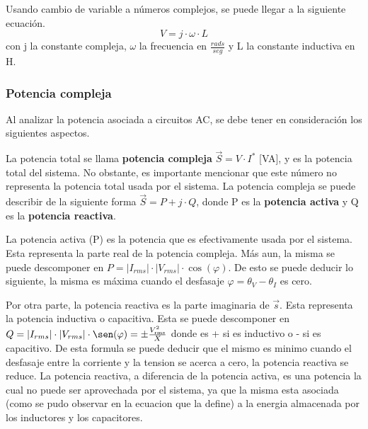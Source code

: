 \documentclass{article}
\begin{document}
        Usando cambio de variable a números complejos, se puede llegar a la siguiente ecuación.
        \begin{equation*}
            V=j\cdot \omega\cdot L
        \end{equation*}
        con j la constante compleja, $\omega$ la frecuencia en $\frac{rads}{seg}$ y L la constante inductiva en H.

        \subsubsection{Potencia compleja}

        Al analizar la potencia asociada a circuitos AC, se debe tener en consideración los siguientes aspectos.\par
        La potencia total se llama { \bfseries potencia compleja} $\vec{S}= V \cdot I^{*}$ [VA], y es la potencia total del sistema. No obstante, es importante mencionar que este número no representa la potencia total usada por el sistema.
        La potencia compleja se puede describir de la siguiente forma $\vec{S}=P + j \cdot Q$, donde P es la { \bfseries potencia activa} y Q es la {\bfseries potencia reactiva}. \par

        La potencia activa (P) es la potencia que es efectivamente usada por el sistema. Esta representa la parte real de la potencia compleja.
        Más aun, la misma se puede descomponer en $P= |I_{rms}| \cdot |V_{rms}| \cdot \cos (\varphi)$. De esto se puede deducir lo siguiente, la misma es máxima cuando el desfasaje $\varphi = \theta_{V} - \theta_I $ es cero. \par

        Por otra parte, la potencia reactiva es la parte imaginaria de $\vec{s}$. Esta representa la potencia inductiva o capacitiva. Esta se puede descomponer en $ Q = |I_{rms}| \cdot |V_{rms}| \cdot \sen (\varphi)= \pm \frac{V_\text{rms}^2}{X}$ donde es + si es inductivo o - si es capacitivo.
        De esta formula se puede deducir que el mismo es minimo cuando el desfasaje entre la corriente y la tension se acerca a cero, 
        la potencia reactiva se reduce. La potencia reactiva, a diferencia de la potencia activa, es una potencia la cual no puede ser aprovechada por el sistema, 
        ya que la misma esta asociada (como se pudo observar en la ecuacion que la define) a la energia almacenada por los inductores y los capacitores.\par
\end{document}
